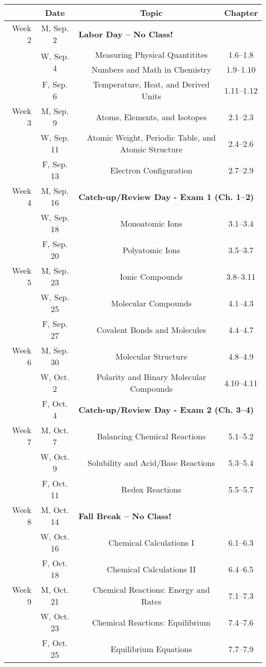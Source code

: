 \documentclass[12pt, letterpaper]{article}
\begin{document}
\noindent
\begin{tabular}{rcccc}
& Date && Topic & Chapter\\
\midrule
Week 2 & M, Sep. 2& \multicolumn{3}{l}{\textbf{Labor Day -- No Class!}}\\
& \multirow{2}{*}{W, Sep. 4}& & Measuring Physical Quantitites & 1.6--1.8\\
& & & Numbers and Math in Chemistry & 1.9--1.10\\
& F, Sep. 6&& Temperature, Heat, and Derived Units & 1.11--1.12\\
\midrule
Week 3 & M, Sep. 9&& Atoms, Elements, and Isotopes & 2.1--2.3\\
& W, Sep. 11&& Atomic Weight, Periodic Table, and Atomic Structure & 2.4--2.6\\
& F, Sep. 13&& Electron Configuration & 2.7--2.9\\
\midrule
Week 4 & M, Sep. 16& \multicolumn{3}{l}{\textbf{Catch-up/Review Day - Exam 1 (Ch. 1--2)}}\\
& W, Sep. 18&& Monoatomic Ions & 3.1--3.4\\
& F, Sep. 20&& Polyatomic Ions & 3.5--3.7\\
\midrule
Week 5 & M, Sep. 23&& Ionic Compounds & 3.8--3.11\\
& W, Sep. 25&& Molecular Compounds & 4.1--4.3\\
& F, Sep. 27&& Covalent Bonds and Molecules & 4.4--4.7\\
\midrule
Week 6 & M, Sep. 30&& Molecular Structure & 4.8--4.9\\
& W, Oct. 2&& Polarity and Binary Molecular Compounds & 4.10--4.11\\
& F, Oct. 4& \multicolumn{3}{l}{\textbf{Catch-up/Review Day - Exam 2 (Ch. 3--4)}}\\
\midrule
Week 7 & M, Oct. 7&& Balancing Chemical Reactions & 5.1--5.2\\
& W, Oct. 9&& Solubility and Acid/Base Reactions & 5.3--5.4\\
& F, Oct. 11&& Redox Reactions & 5.5--5.7\\
\midrule
Week 8 & M, Oct. 14& \multicolumn{3}{l}{\textbf{Fall Break -- No Class!}}\\
& W, Oct. 16&& Chemical Calculations I & 6.1--6.3\\
& F, Oct. 18&& Chemical Calculations II & 6.4--6.5\\
\midrule
Week 9 & M, Oct. 21&& Chemical Reactions: Energy and Rates & 7.1--7.3\\
& W, Oct. 23&& Chemical Reactions: Equilibrium & 7.4--7.6\\
& F, Oct. 25&& Equilibrium Equations & 7.7--7.9\\
\end{tabular}
\end{document}
